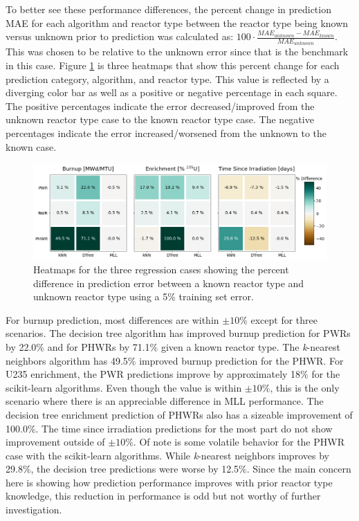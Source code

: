 To better see these performance differences, the percent change in prediction
\gls{MAE} for each algorithm and reactor type between the reactor type being
known versus unknown prior to prediction was calculated as: $100 \cdot
\frac{MAE_{unknown} - MAE_{known}}{MAE_{unknown}}$.  This was chosen to be
relative to the unknown error since that is the benchmark in this case.  Figure
\ref{fig:knownrxtr} is three heatmaps that show this percent change for each
prediction category, algorithm, and reactor type.  This value is reflected by a
diverging color bar as well as a positive or negative percentage in each
square.  The positive percentages indicate the error decreased/improved from
the unknown reactor type case to the known reactor type case.  The negative
percentages indicate the error increased/worsened from the unknown to the known
case. 

\begin{figure}[!htb]
  \centering
  \includegraphics[width=\textwidth]{./chapters/exp1/rxtr-type_known-unknown_diff_err05.png}
  \caption[Heatmaps for three regression cases comparing known versus 
           unknown reactor type prior knowledge]
          {Heatmaps for the three regression cases showing the percent 
           difference in prediction error between a known reactor type 
           and unknown reactor type using a 5\% training set error.}
  \label{fig:knownrxtr}
\end{figure}

For burnup prediction, most differences are within $\pm10\%$ except for three
scenarios.  The decision tree algorithm has improved burnup prediction for
\gls{PWR}s by 22.0\% and for \gls{PHWR}s by 71.1\% given a known reactor type.
The \textit{k}-nearest neighbors algorithm has 49.5\% improved burnup
prediction for the \gls{PHWR}. For \gls{U235} enrichment, the \gls{PWR}
predictions improve by approximately 18\% for the scikit-learn algorithms.
Even though the value is within $\pm10\%$, this is the only scenario where
there is an appreciable difference in \gls{MLL} performance. The decision tree
enrichment prediction of \gls{PHWR}s also has a sizeable improvement of
100.0\%.  The time since irradiation predictions for the most part do not show
improvement outside of $\pm10\%$. Of note is some volatile behavior for the
\gls{PHWR} case with the scikit-learn algorithms.  While \textit{k}-nearest
neighbors improves by 29.8\%, the decision tree predictions were worse by
12.5\%.  Since the main concern here is showing how prediction performance
improves with prior reactor type knowledge, this reduction in performance is
odd but not worthy of further investigation.

